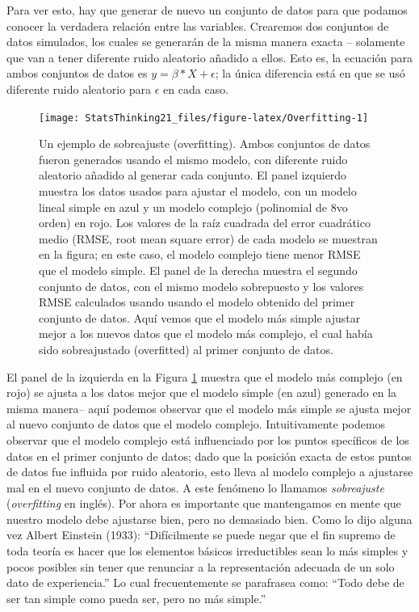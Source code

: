 \documentclass[
  12pt,
]{book}
\begin{document}
Para ver esto, hay que generar de nuevo un conjunto de datos para que podamos conocer la verdadera relación entre las variables. Crearemos dos conjuntos de datos simulados, los cuales se generarán de la misma manera exacta -- solamente que van a tener diferente ruido aleatorio añadido a ellos. Esto es, la ecuación para ambos conjuntos de datos es \(y = \beta * X + \epsilon\); la única diferencia está en que se usó diferente ruido aleatorio para \(\epsilon\) en cada caso.

\begin{figure}
\texttt{[image: StatsThinking21\_files/figure-latex/Overfitting-1]} \caption{Un ejemplo de sobreajuste (overfitting). Ambos conjuntos de datos fueron generados usando el mismo modelo, con diferente ruido aleatorio añadido al generar cada conjunto. El panel izquierdo muestra los datos usados para ajustar el modelo, con un modelo lineal simple en azul y un modelo complejo (polinomial de 8vo orden) en rojo. Los valores de la raíz cuadrada del error cuadrático medio (RMSE, root mean square error) de cada modelo se muestran en la figura; en este caso, el modelo complejo tiene menor RMSE que el modelo simple. El panel de la derecha muestra el segundo conjunto de datos, con el mismo modelo sobrepuesto y los valores RMSE calculados usando usando el modelo obtenido del primer conjunto de datos. Aquí vemos que el modelo más simple ajustar mejor a los nuevos datos que el modelo más complejo, el cual había sido sobreajustado (overfitted) al primer conjunto de datos.}\label{fig:Overfitting}
\end{figure}

El panel de la izquierda en la Figura \ref{fig:Overfitting} muestra que el modelo más complejo (en rojo) se ajusta a los datos mejor que el modelo simple (en azul) generado en la misma manera-- aquí podemos observar que el modelo más simple se ajusta mejor al nuevo conjunto de datos que el modelo complejo. Intuitivamente podemos observar que el modelo complejo está influenciado por los puntos specíficos de los datos en el primer conjunto de datos; dado que la posición exacta de estos puntos de datos fue influida por ruido aleatorio, esto lleva al modelo complejo a ajustarse mal en el nuevo conjunto de datos. A este fenómeno lo llamamos \emph{sobreajuste} (\emph{overfitting} en inglés). Por ahora es importante que mantengamos en mente que nuestro modelo debe ajustarse bien, pero no demasiado bien. Como lo dijo alguna vez Albert Einstein (1933): ``Difícilmente se puede negar que el fin supremo de toda teoría es hacer que los elementos básicos irreductibles sean lo más simples y pocos posibles sin tener que renunciar a la representación adecuada de un solo dato de experiencia.'' Lo cual frecuentemente se parafrasea como: ``Todo debe de ser tan simple como pueda ser, pero no más simple.''
\end{document}
